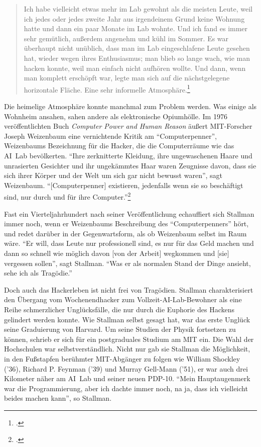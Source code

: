 \begin{quote}
Ich habe vielleicht etwas mehr im Lab gewohnt als die meisten Leute, weil ich jedes oder jedes zweite Jahr aus irgendeinem Grund keine Wohnung hatte und dann ein paar Monate im Lab wohnte. Und ich fand es immer sehr gemütlich, außerdem angenehm und kühl im Sommer. Es war überhaupt nicht unüblich, dass man im Lab eingeschlafene Leute gesehen hat, wieder wegen ihres Enthusiasmus; man blieb so lange wach, wie man hacken konnte, weil man einfach nicht aufhören wollte. Und dann, wenn man komplett erschöpft war, legte man sich auf die nächstgelegene horizontale Fläche. Eine sehr informelle Atmosphäre.\footcite[Vgl.][]{rmskth}
\end{quote}

Die heimelige Atmosphäre konnte manchmal zum Problem werden. Was einige als Wohnheim ansahen, sahen andere als elektronische Opiumhölle. Im 1976 veröffentlichten Buch \textit{Computer Power and Human Reason} äußert MIT-Forscher Joseph Weizenbaum eine vernichtende Kritik am "`Computerpenner"', Weizenbaums Bezeichnung für die Hacker, die die Computerräume wie das AI~Lab bevölkerten. "`Ihre zerknitterte Kleidung, ihre ungewaschenen Haare und unrasierten Gesichter und ihr ungekämmtes Haar waren Zeugnisse davon, dass sie sich ihrer Körper und der Welt um sich gar nicht bewusst waren"', sagt Weizenbaum. "`[Computerpenner] existieren, jedenfalls wenn sie so beschäftigt sind, nur durch und für ihre Computer."'\footcite[Vgl.][S.\,116 oder \url{http://www.sacbusiness.org/cs/hesterj/HACKER.htm}]{comppower}

Fast ein Vierteljahrhundert nach seiner Veröffentlichung echauffiert sich Stallman immer noch, wenn er Weizenbaums Beschreibung des "`Computerpenners"' hört, und redet darüber in der Gegenwartsform, als ob Weizenbaum selbst im Raum wäre. "`Er will, dass Leute nur professionell sind, es nur für das Geld machen und dann so schnell wie möglich davon [von der Arbeit] wegkommen und [sie] vergessen sollen"', sagt Stallman. "`Was er als normalen Stand der Dinge ansieht, sehe ich als Tragödie."'

Doch auch das Hackerleben ist nicht frei von Tragödien. Stallman charakterisiert den Übergang vom Wochenendhacker zum Vollzeit-AI-Lab-Bewohner als eine Reihe schmerzlicher Unglücksfälle, die nur durch die Euphorie des Hackens gelindert werden konnte. Wie Stallman selbst gesagt hat, war das erste Unglück seine Graduierung von Harvard. Um seine Studien der Physik fortsetzen zu können, schrieb er sich für ein postgraduales Studium am MIT ein. Die Wahl der Hochschulen war selbstverständlich. Nicht nur gab sie Stallman die Möglichkeit, in den Fußstapfen berühmter MIT-Abgänger zu folgen wie William Shockley ('36), Richard P. Feynman ('39)  und Murray Gell-Mann ('51), er war auch drei Kilometer näher am AI~Lab und seiner neuen PDP-10. "`Mein Hauptaugenmerk war die Programmierung, aber ich dachte immer noch, na ja, dass ich vielleicht beides machen kann"', so Stallman.

